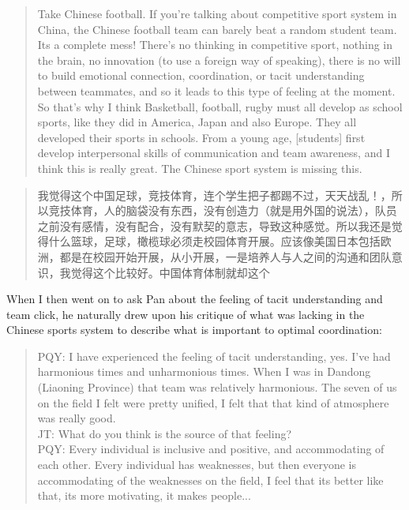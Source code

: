 \begin{CJK}{UTF8}{gbsn}
\begin{quote}
  Take Chinese football.  If you’re talking about competitive sport system in China, the Chinese football team can barely beat a random student team. Its a complete mess! There’s no thinking in competitive sport, nothing in the brain, no innovation (to use a foreign way of speaking), there is no will to build emotional connection, coordination, or tacit understanding between teammates, and so it leads to this type of feeling at the moment.  So that's why I think Basketball, football, rugby must all develop as school sports, like they did in America, Japan and also Europe. They all developed their sports in schools. From a young age, [students] first develop interpersonal skills of communication and team awareness, and I think this is really great.  The Chinese sport system is missing this.
\end{quote}

\begin{quote}
  我觉得这个中国足球，竞技体育，连个学生把子都踢不过，天天战乱！，所以竞技体育，人的脑袋没有东西，没有创造力（就是用外国的说法），队员之前没有感情，没有配合，没有默契的意志，导致这种感觉。所以我还是觉得什么篮球，足球，橄榄球必须走校园体育开展。应该像美国日本包括欧洲，都是在校园开始开展，从小开展，一是培养人与人之间的沟通和团队意识，我觉得这个比较好。中国体育体制就却这个
\end{quote}

When I then went on to ask Pan about the feeling of tacit understanding and team click, he naturally drew upon his critique of what was lacking in the Chinese sports system to describe what is important to optimal coordination:

  \begin{quote}
    PQY: I have experienced the feeling of tacit understanding, yes. I've had harmonious times and unharmonious times. When I was in Dandong (Liaoning Province) that team was relatively harmonious.  The seven of us on the field I felt were pretty unified, I felt that that kind of atmosphere was really good. \\
    JT: What do you think is the source of that feeling? \\
    PQY: Every individual is inclusive and positive, and accommodating of each other. Every individual has weaknesses, but then everyone is accommodating of the weaknesses on the field, I feel that its better like that, its more motivating, it makes people...
  \end{quote}


\end{CJK}
